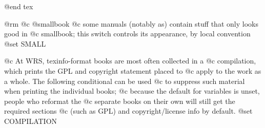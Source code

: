 \newdimen\extra\extra=0pt %
\global\def\widen#1{\advance\extra by #1%
\advance\leftskip by -#1\advance\rightskip by -#1}
%
\def\smallbook{

\global\secheadingskip = 17pt plus 6pt minus 3pt
\global\subsecheadingskip = 14pt plus 6pt minus 3pt

\global\lispnarrowing = 0.3in
\setleading{12pt}
\advance\topskip by -1cm
\global\parskip 3pt plus 1pt
\global\hsize = 5in
\advance\normaloffset by 1in %
\global\vsize=7.5in
\advance\voffset by .7in %
\global\tolerance=1400
\global\hfuzz=1pt
\global\contentsrightmargin=0pt

\global\pagewidth=\hsize
\global\pageheight=\vsize

}
\textfonts

@end tex

@rm
@c @smallbook
@c some manuals (notably as) contain stuff that only looks good in
@c smallbook; this switch controls its appearance, by local convention
@set SMALL

@c At WRS, texinfo-format books are most often collected in a
@c compilation, which prints the GPL and copyright statement placed to
@c apply to the work as a whole.  The following conditional can be used
@c to suppress such material when printing the individual books;
@c because the default for variables is unset, people who reformat the
@c separate books on their own will still get the required sections
@c (such as GPL) and copyright/license info by default.
@set COMPILATION

